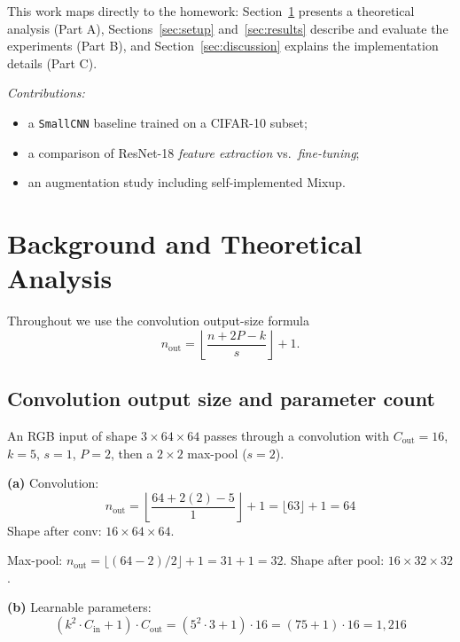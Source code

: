 \documentclass[10pt,twocolumn,letterpaper]{article}
\begin{document}
This work maps directly to the homework: Section~\ref{sec:theory} presents a
theoretical analysis (Part A), Sections~\ref{sec:setup} and~\ref{sec:results}
describe and evaluate the experiments (Part B), and Section~\ref{sec:discussion}
explains the implementation details (Part C).

\noindent\textit{Contributions:}
\begin{itemize}[leftmargin=1.2em,itemsep=1pt,topsep=2pt]
  \item a \texttt{SmallCNN} baseline trained on a CIFAR-10 subset;
  \item a comparison of ResNet-18 \emph{feature extraction} vs.\ \emph{fine-tuning};
  \item an augmentation study including self-implemented Mixup.
\end{itemize}

\section{Background and Theoretical Analysis}\label{sec:theory}

Throughout we use the convolution output-size formula
\begin{equation}\label{eq:convsize}
  n_{\text{out}} = \left\lfloor \frac{n + 2P - k}{s} \right\rfloor + 1 .
\end{equation}

\subsection{Convolution output size and parameter count}

An RGB input of shape $3\times64\times64$ passes through a convolution with
$C_{\text{out}}=16$, $k=5$, $s=1$, $P=2$, then a $2\times2$ max-pool ($s=2$).

\textbf{(a)} Convolution:
\begin{equation}
n_{\text{out}} = \left\lfloor \frac{64 + 2(2) - 5}{1} \right\rfloor + 1
= \lfloor 63 \rfloor + 1 = 64
\end{equation}
Shape after conv: $16 \times 64 \times 64$.

Max-pool: $n_{\text{out}} = \lfloor (64 - 2)/2 \rfloor + 1 = 31 + 1 = 32$.
Shape after pool: $16 \times 32 \times 32$.

\textbf{(b)} Learnable parameters:
\begin{equation}
(k^2 \cdot C_{\text{in}} + 1) \cdot C_{\text{out}}
= (5^2 \cdot 3 + 1) \cdot 16
= (75 + 1) \cdot 16
= 1,216
\end{equation}
\end{document}
